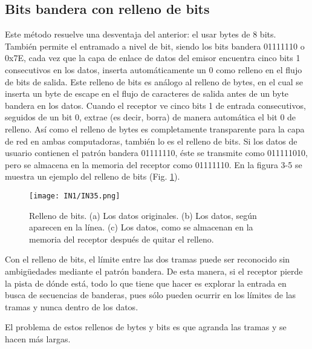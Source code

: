 \documentclass[
	12pt, %
	fleqn, %
	a4paper, %
]{LegrandOrangeBook}
\begin{document}
\subsection{Bits bandera con relleno de bits}
Este método resuelve una desventaja del anterior: el usar bytes de 8 bits. También permite el entramado a nivel de bit, siendo los bits bandera 01111110 o 0x7E, cada vez que la capa de enlace de datos del emisor encuentra cinco bits 1 consecutivos en los datos, inserta automáticamente un 0 como relleno en el flujo de bits de salida. Este relleno de bits es análogo al relleno de bytes, en el cual se inserta un byte de escape en el flujo de caracteres de salida antes de un byte bandera en los datos. Cuando el receptor ve cinco bits 1 de entrada consecutivos, seguidos de un bit 0, extrae (es decir, borra) de manera automática el bit 0 de relleno. Así como el relleno de bytes es completamente transparente para la capa de red en ambas computadoras, también lo es el relleno de bits. Si los datos de usuario contienen el patrón bandera 01111110, éste se transmite como 011111010, pero se almacena en la memoria del receptor como 01111110. En la figura 3-5 se muestra un ejemplo del relleno de bits (Fig. \ref{fig: bandera bits}).
\begin{figure}[]
\centering
\texttt{[image: IN1/IN35.png]}
\caption{Relleno de bits. (a) Los datos originales. (b) Los datos, según aparecen en la línea. (c) Los datos, como se almacenan en la memoria del receptor después de quitar el relleno.}
\label{fig: bandera bits}
\end{figure}
Con el relleno de bits, el límite entre las dos tramas puede ser reconocido sin ambigüedades mediante el patrón bandera. De esta manera, si el receptor pierde la pista de dónde está, todo lo que tiene que hacer es explorar la entrada en busca de secuencias de banderas, pues sólo pueden ocurrir en los límites de las
tramas y nunca dentro de los datos.
\begin{remark}
El problema de estos rellenos de bytes y bits es que agranda las tramas y se hacen más largas.
\end{remark}
\end{document}
